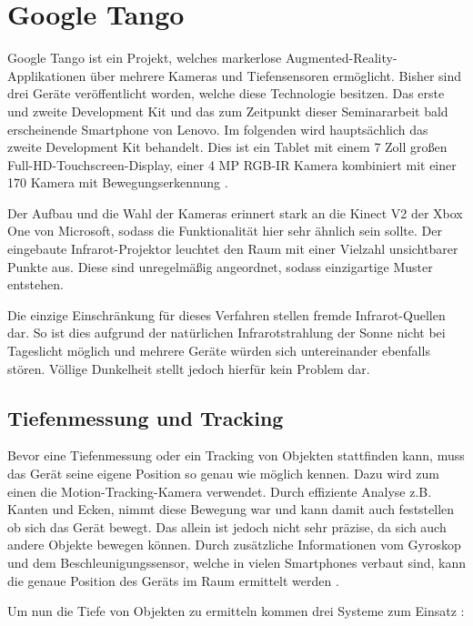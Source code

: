 
\section{Google Tango}

Google Tango ist ein Projekt, welches markerlose Augmented-Reality-Applikationen über mehrere Kameras und Tiefensensoren ermöglicht. Bisher sind drei Geräte veröffentlicht worden, welche diese Technologie besitzen. Das erste und zweite Development Kit und das zum Zeitpunkt dieser Seminararbeit bald erscheinende Smartphone von Lenovo. Im folgenden wird hauptsächlich das zweite Development Kit behandelt. Dies ist ein Tablet mit einem 7 Zoll großen Full-HD-Touchscreen-Display, einer 4 MP RGB-IR Kamera kombiniert mit einer 170\degree\/ Kamera mit Bewegungserkennung \cite{tango_teardown}.\par
Der Aufbau und die Wahl der Kameras erinnert stark an die Kinect V2 der Xbox One von Microsoft, sodass die Funktionalität hier sehr ähnlich sein sollte. Der eingebaute Infrarot-Projektor leuchtet den Raum mit einer Vielzahl unsichtbarer Punkte aus. Diese sind unregelmäßig angeordnet, sodass einzigartige Muster entstehen.\par
Die einzige Einschränkung für dieses Verfahren stellen fremde Infrarot-Quellen dar. So ist dies aufgrund der natürlichen Infrarotstrahlung der Sonne nicht bei Tageslicht möglich und mehrere Geräte würden sich untereinander ebenfalls stören. Völlige Dunkelheit stellt jedoch hierfür kein Problem dar.

\subsection{Tiefenmessung und Tracking}
Bevor eine Tiefenmessung oder ein Tracking von Objekten stattfinden kann, muss das Gerät seine eigene Position so genau wie möglich kennen. Dazu wird zum einen die Motion-Tracking-Kamera verwendet. Durch effiziente Analyse z.B. Kanten und Ecken, nimmt diese Bewegung war und kann damit auch feststellen ob sich das Gerät bewegt. Das allein ist jedoch nicht sehr präzise, da sich auch andere Objekte bewegen können. Durch zusätzliche Informationen vom Gyroskop und dem Beschleunigungssensor, welche in vielen Smartphones verbaut sind, kann die genaue Position des Geräts im Raum ermittelt werden \cite{tango_technology}.\par
Um nun die Tiefe von Objekten zu ermitteln kommen drei Systeme zum Einsatz \cite{kinect_imaging}\cite{depth_perception}:
